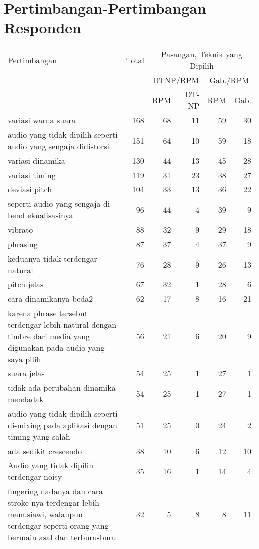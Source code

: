 \chapter{Pertimbangan-Pertimbangan Responden}\label{appendix-pertimbangan}

	\begin{longtable}{|p{}|r|r|r|r|r|}
	\hline
Pertimbangan&	Total&	\multicolumn{4}{|c|}{Pasangan, Teknik yang Dipilih}\\
\cline{3-6}
&	&	\multicolumn{2}{|c|}{DTNP/RPM}	&\multicolumn{2}{|c|}{Gab./RPM}\\
\cline{3-6}
&	&	RPM&	DT-NP&	RPM&	Gab.\\\hline
\endhead
variasi warna suara&	168&	68&	11&	59&	30\\\hline
audio yang tidak dipilih seperti audio yang sengaja didistorsi&	151&	64&	10&	59&	18\\\hline
variasi dinamika&	130&	44&	13&	45&	28\\\hline
variasi timing&	119&	31&	23&	38&	27\\\hline
deviasi pitch&	104&	33&	13&	36&	22\\\hline
seperti audio yang sengaja di-bend ekualisasinya&	96&	44&	4&	39&	9\\\hline
vibrato&	88&	32&	9&	29&	18\\\hline
phrasing&	87&	37&	4&	37&	9\\\hline
keduanya tidak terdengar natural&	76&	28&	9&	26&	13\\\hline
pitch jelas&	67&	32&	1&	28&	6\\\hline
cara dinamikanya beda2&	62&	17&	8&	16&	21\\\hline
karena phrase tersebut terdengar lebih natural dengan timbre dari media yang digunakan pada audio yang saya pilih&	56&	21&	6&	20&	9\\\hline
suara jelas&	54&	25&	1&	27&	1\\\hline
tidak ada perubahan dinamika mendadak&	54&	25&	1&	27&	1\\\hline
audio yang tidak dipilih seperti di-mixing pada aplikasi dengan timing yang salah&	51&	25&	0&	24&	2\\\hline
ada sedikit crescendo&	38&	10&	6&	12&	10\\\hline
Audio yang tidak dipilih terdengar noisy&	35&	16&	1&	14&	4\\\hline
fingering nadanya dan cara stroke-nya terdengar lebih manusiawi, walaupun terdengar seperti orang yang bermain asal dan terburu-buru&	32&	5&	8&	8&	11\\\hline

\end{longtable}
